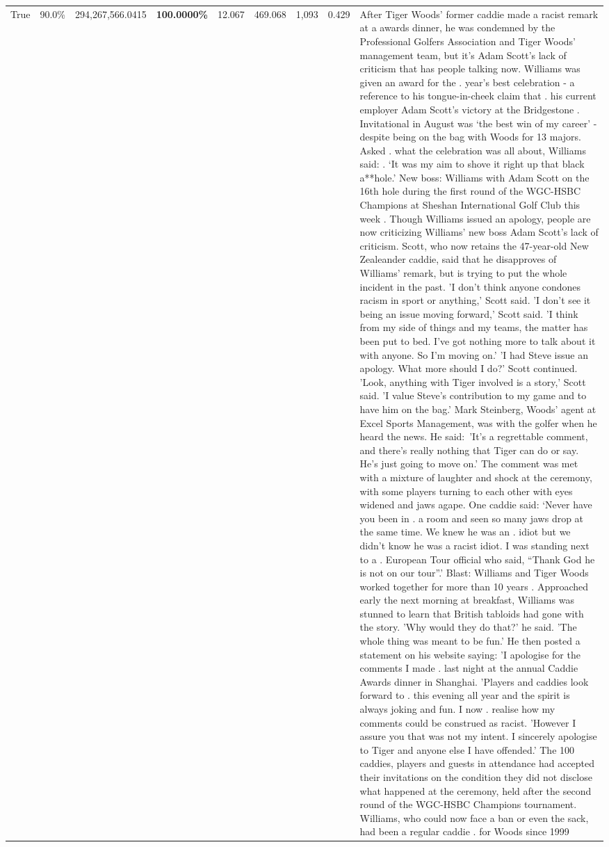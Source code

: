 \begin{table}[H]
\begin{tabular}{lllrlllll}
True & 90.0\% & 294,267,566.0415 & \bfseries \color{red} 100.0000\% & 12.067 & 469.068 & 1,093 & 0.429 & After Tiger Woods' former caddie made a racist remark at a awards dinner, he was condemned by the Professional Golfers Association and Tiger Woods' management team, but it's Adam Scott's lack of criticism that has people talking now. Williams was given an award for the . year’s best celebration - a reference to his tongue-in-cheek claim that . his current employer Adam Scott’s victory at the Bridgestone . Invitational in August was ‘the best win of my career’ - despite being on the bag with Woods for 13 majors. Asked . what the celebration was all about, Williams said: . ‘It was my aim to shove it right up that black a**hole.’ New boss: Williams with Adam Scott  on the 16th hole during the first round of the WGC-HSBC Champions at Sheshan International Golf Club this week . Though Williams issued an apology, people are now criticizing Williams' new boss Adam Scott's lack of criticism. Scott, who now retains the 47-year-old New Zealeander caddie, said that he disapproves of Williams' remark, but is trying to put the whole incident in the past. 'I don't think anyone condones racism in sport or anything,' Scott said. 'I don't see it being an issue moving forward,' Scott said. 'I think from my side of things and my teams, the matter has been put to bed. I've got nothing more to talk about it with anyone. So I'm moving on.' 'I had Steve issue an apology. What more should I do?' Scott continued. 'Look, anything with Tiger involved is a story,' Scott said. 'I value Steve's contribution to my game and to have him on the bag.' Mark Steinberg, Woods' agent at Excel Sports Management, was with the golfer when he heard the news. He said: 'It's a regrettable comment, and there's really nothing that Tiger can do or say. He's just going to move on.' The comment was met with a mixture of laughter and shock at the ceremony, with some players turning to each other with eyes widened and jaws agape. One caddie said: ‘Never have you been in . a room and seen so many jaws drop at the same time. We knew he was an . idiot but we didn’t know he was a racist idiot. I was standing next to a . European Tour official who said, “Thank God he is not on our tour”.’ Blast: Williams and Tiger Woods worked together for more than 10 years . Approached early the next morning at breakfast, Williams was stunned to learn that British tabloids had gone with the story. 'Why would they do that?' he said. 'The whole thing was meant to be fun.' He then posted a statement on his website saying: 'I apologise for the comments I made . last night at the annual Caddie Awards dinner in Shanghai. 'Players and caddies look forward to . this evening all year and the spirit is always joking and fun. I now . realise how my comments could be construed as racist. 'However I assure you that was not my intent. I sincerely apologise to Tiger and anyone else I have offended.' The 100 caddies, players and guests in attendance had accepted their invitations on the condition they did not disclose what happened at the ceremony, held after the second round of the WGC-HSBC Champions tournament. Williams, who could now face a ban or even the sack, had been a regular caddie . for Woods since 1999 
\end{tabular}
\end{table}
